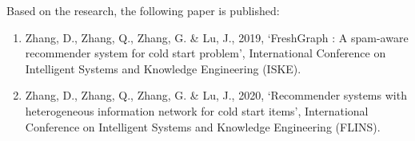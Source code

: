 \bigskip
\bigskip
Based on the research, the following paper is published:
\begin{enumerate}
    \item Zhang, D., Zhang, Q., Zhang, G. \& Lu, J., 2019,  ‘FreshGraph :  A spam-aware recommender system for cold start problem’, International Conference on Intelligent Systems and Knowledge Engineering (ISKE).
    \item Zhang, D., Zhang, Q., Zhang, G. \& Lu, J., 2020, ‘Recommender systems with heterogeneous information network for cold start items’, International Conference on Intelligent Systems and Knowledge Engineering (FLINS).
\end{enumerate}
 
